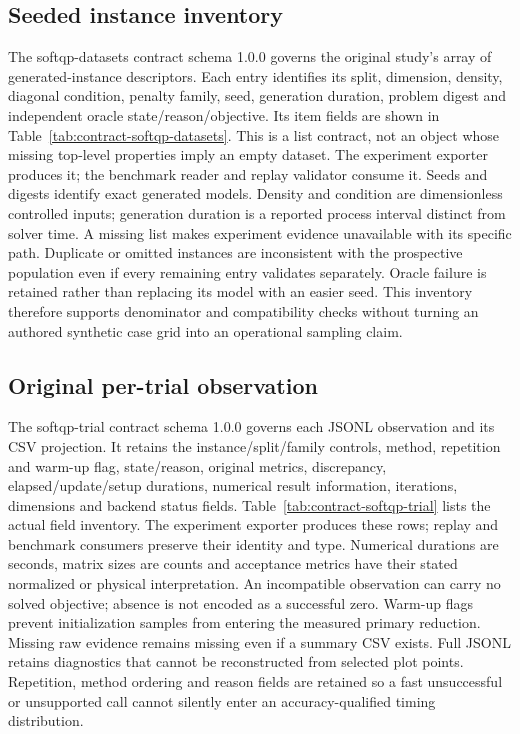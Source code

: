 \subsection{Seeded instance inventory}\label{sec:contract-softqp-datasets}
The softqp-datasets contract schema 1.0.0 governs the original study's array
of generated-instance descriptors. Each entry identifies its split, dimension,
density, diagonal condition, penalty family, seed, generation duration,
problem digest and independent oracle state/reason/objective. Its item fields
are shown in Table~\ref{tab:contract-softqp-datasets}. This is a list contract,
not an object whose missing top-level properties imply an empty dataset.
The experiment exporter produces it; the benchmark reader and replay validator
consume it. Seeds and digests identify exact generated models. Density and
condition are dimensionless controlled inputs; generation duration is a
reported process interval distinct from solver time. A missing list makes
experiment evidence unavailable with its specific path. Duplicate or omitted
instances are inconsistent with the prospective population even if every
remaining entry validates separately. Oracle failure is retained rather than
replacing its model with an easier seed. This inventory therefore supports
denominator and compatibility checks without turning an authored synthetic
case grid into an operational sampling claim.


\subsection{Original per-trial observation}\label{sec:contract-softqp-trial}
The softqp-trial contract schema 1.0.0 governs each JSONL observation and its
CSV projection. It retains the instance/split/family controls, method,
repetition and warm-up flag, state/reason, original metrics, discrepancy,
elapsed/update/setup durations, numerical result information, iterations,
dimensions and backend status fields. Table~\ref{tab:contract-softqp-trial}
lists the actual field inventory. The experiment exporter produces these
rows; replay and benchmark consumers preserve their identity and type.
Numerical durations are seconds, matrix sizes are counts and acceptance
metrics have their stated normalized or physical interpretation. An
incompatible observation can carry no solved objective; absence is not
encoded as a successful zero. Warm-up flags prevent initialization samples
from entering the measured primary reduction. Missing raw evidence remains
missing even if a summary CSV exists. Full JSONL retains diagnostics that
cannot be reconstructed from selected plot points. Repetition, method
ordering and reason fields are retained so a fast unsuccessful or unsupported
call cannot silently enter an accuracy-qualified timing distribution.


